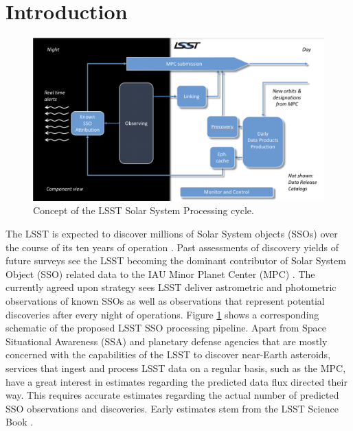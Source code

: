 \section{Introduction} \label{sec:intro}
\begin{figure}[tb!]
\begin{center}
\includegraphics[scale=0.27]{./figs/mops2.png}
\end{center}
\caption{Concept of the \gls{LSST} Solar System Processing cycle.}
\label{fig:mops}       %
\end{figure}
The \gls{LSST} is expected to discover millions of Solar System objects (SSOs) over the course of its ten years of operation \citep{jones2015asteroid}.
Past assessments of discovery yields of future surveys see the \gls{LSST} becoming the dominant contributor of Solar System \gls{Object} (\gls{SSO}) related data to the \gls{IAU} Minor Planet \gls{Center} (\gls{MPC}) \citep{LSSTscibook2009}. The currently agreed upon strategy sees \gls{LSST} deliver astrometric and photometric observations of
known SSOs as well as observations that represent potential discoveries after every night of operations.
Figure \ref{fig:mops} shows a corresponding schematic of the proposed \gls{LSST} \gls{SSO} processing \gls{pipeline}.
Apart from Space Situational Awareness (\gls{SSA}) and planetary defense agencies that are mostly concerned with the capabilities of the \gls{LSST} to discover near-Earth asteroids, services that ingest and process \gls{LSST} data on a regular basis, such as the \gls{MPC},
have a great interest in estimates regarding the predicted data \gls{flux} directed their way. This requires accurate estimates regarding the actual number of predicted \gls{SSO} observations and discoveries. Early estimates stem from the \gls{LSST} Science Book \citep{LSSTscibook2009}.
